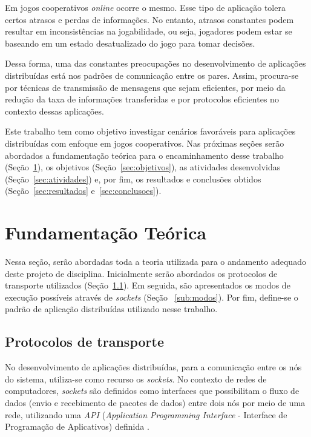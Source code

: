 \documentclass[12pt]{article}
\begin{document}
Em jogos cooperativos \textit{online} ocorre o mesmo. Esse tipo de aplicação
tolera certos atrasos e perdas de informações. No entanto, atrasos constantes
podem resultar em inconsistências na jogabilidade, ou seja, jogadores podem
estar se baseando em um estado desatualizado do jogo para tomar decisões.

Dessa forma, uma das constantes preocupações no desenvolvimento de aplicações
distribuídas está nos padrões de comunicação entre os pares. Assim,
procura-se por técnicas de transmissão de mensagens que sejam eficientes, por
meio da redução da taxa de informações transferidas e por protocolos eficientes
no contexto dessas aplicações.

Este trabalho tem como objetivo investigar cenários favoráveis para aplicações
distribuídas com enfoque em jogos cooperativos. Nas próximas seções serão
abordados a fundamentação teórica para o encaminhamento desse trabalho
(Seção~\ref{sec:fundamentacao}), os objetivos (Seção~\ref{sec:objetivos}), as
atividades desenvolvidas (Seção~\ref{sec:atividades}) e, por fim, os resultados
e conclusões obtidos (Seção~\ref{sec:resultados} e~\ref{sec:conclusoes}).

\section{Fundamentação Teórica} \label{sec:fundamentacao}

Nessa seção, serão abordadas toda a teoria utilizada para o andamento adequado
deste projeto de disciplina. Inicialmente serão abordados os protocolos de
transporte utilizados (Seção~\ref{sub:protocolos}). Em seguida, são
apresentados os modos de execução possíveis através de \textit{sockets} (Seção
~\ref{sub:modos}). Por fim, define-se o padrão de aplicação distribuídas
utilizado nesse trabalho.

\subsection{Protocolos de transporte} \label{sub:protocolos}

No desenvolvimento de aplicações distribuídas, para a comunicação entre os nós
do sistema, utiliza-se como recurso os \emph{sockets}. No contexto de redes de
computadores, \emph{sockets} são definidos como interfaces que possibilitam o
fluxo de dados (envio e recebimento de pacotes de dados) entre dois nós por
meio de uma rede, utilizando uma \emph{API} (\emph{Application Programming
Interface} - Interface de Programação de Aplicativos) definida \cite{Tanenbaum}.
\end{document}
